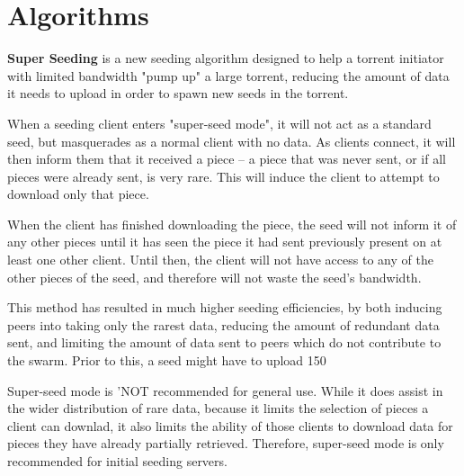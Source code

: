 \documentclass[11pt]{article}
\begin{document}
  \section*{Algorithms}
  \begin{flushleft}
    \textbf{Super Seeding} is a new seeding algorithm designed to help a torrent initiator with limited bandwidth "pump up" a large torrent, reducing the amount of data it needs to upload in order to spawn new seeds in the torrent.

  \end{flushleft}
  \begin{flushleft}

    When a seeding client enters "super-seed mode", it will not act as a standard seed, but masquerades as a normal client with no data. As clients connect, it will then inform them that it received a piece -- a piece that was never sent, or if all pieces were already sent, is very rare. This will induce the client to attempt to download only that piece.

  \end{flushleft}
  \begin{flushleft}

    When the client has finished downloading the piece, the seed will not inform it of any other pieces until it has seen the piece it had sent previously present on at least one other client. Until then, the client will not have access to any of the other pieces of the seed, and therefore will not waste the seed's bandwidth.

  \end{flushleft}
  \begin{flushleft}

    This method has resulted in much higher seeding efficiencies, by both inducing peers into taking only the rarest data, reducing the amount of redundant data sent, and limiting the amount of data sent to peers which do not contribute to the swarm. Prior to this, a seed might have to upload 150%

  \end{flushleft}
  \begin{flushleft}

    Super-seed mode is 'NOT recommended for general use. While it does assist in the wider distribution of rare data, because it limits the selection of pieces a client can downlad, it also limits the ability of those clients to download data for pieces they have already partially retrieved. Therefore, super-seed mode is only recommended for initial seeding servers.

  \end{flushleft}
\end{document}
